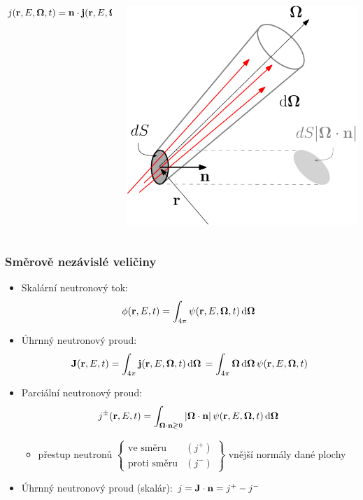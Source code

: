 \begin{frame}
\begin{columns}
\begin{column}{.60\linewidth}
\begin{itemize}
\begin{myitemize}
	  	\item $j(\br,E,\bomega,t) = \bn\cdot\bj(\br,E,\bomega,t)\,\d{S}\d{\bomega}\d{E}$
	  \end{myitemize}
  \end{itemize}
  \end{column}
  \begin{column}{.30\linewidth}
   	\includegraphics[scale=.45]{obr/angcur}
  \end{column}
  \end{columns}
\end{frame}

\begin{frame}
  \frametitle{Směrově nezávislé veličiny}
  \shorten{-.2em}{-.2em}
  \begin{itemize}
	  \item Skalární neutronový tok:
	    $$ \fl(\br,E,t) = \aint{\angflux(\br,E,\bomega,t)} $$
	  \item Úhrnný neutronový proud: 
	    $$\bJ(\br,E,t)	= \aint{\bj(\br,E,\bomega,t)} = \aint\bomega\angflux(\br,E,\bomega,t)$$
	  \item Parciální neutronový proud:
	    $$
	      j^{\pm}(\br,E,t) = \Aint[\bomega\cdot\bn \gtrless 0]{\abs{\bomega\cdot\bn}\angflux(\br,E,\bomega,t)}
	    $$
	    \vspace*{-.5em}
	  \begin{itemize}
	  	\item přestup neutronů
	  	  $\left.\begin{cases} \mbox{ve směru} &(j^+)\\
	  	    \mbox{proti směru} &(j^-)
	  	    \end{cases}\right\}$
	  	  vnější normály dané plochy
	  \end{itemize}
	  \vspace*{.5em}
	  \item Úhrnný neutronový proud (skalár): $j = \bJ\cdot\bn = j^+-j^-$
  \end{itemize}
\lengthen
\end{frame}


